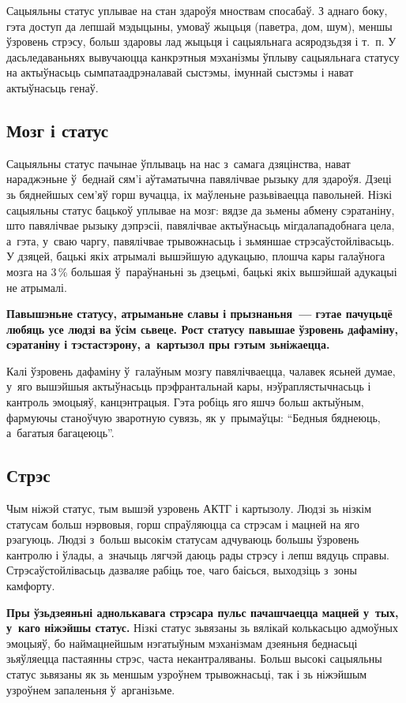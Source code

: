 Сацыяльны статус уплывае на стан здароўя мноствам спосабаў. З аднаго боку, гэта доступ да лепшай мэдыцыны, умоваў жыцьця (паветра, дом, шум), меншы ўзровень стрэсу, больш здаровы лад жыцьця і сацыяльнага асяродзьдзя і т.~п. У дасьледаваньнях вывучаюцца канкрэтныя мэханізмы ўплыву сацыяльнага статусу на актыўнасьць сымпатаадрэналавай сыстэмы, імуннай сыстэмы і нават актыўнасьць генаў.

\subsection*{Мозг і статус}

Сацыяльны статус пачынае ўплываць на нас з~самага дзяцінства, нават нараджэньне ў~беднай сям'і аўтаматычна павялічвае рызыку для здароўя. Дзеці зь бяднейшых сем'яў горш вучацца, іх маўленьне разьвіваецца павольней. Нізкі сацыяльны статус бацькоў уплывае на мозг: вядзе да зьмены абмену сэратаніну, што павялічвае рызыку дэпрэсіі, павялічвае актыўнасьць мігдалападобнага цела, а~гэта, у~сваю чаргу, павялічвае трывожнасьць і зьмяншае стрэсаўстойлівасьць. У дзяцей, бацькі якіх атрымалі вышэйшую адукацыю, плошча кары галаўнога мозга на 3\,\% большая ў~параўнаньні зь дзецьмі, бацькі якіх вышэйшай адукацыі не атрымалі.

\textbf{Павышэньне статусу, атрыманьне славы і прызнаньня~--- гэтае пачуцьцё любяць усе людзі ва ўсім сьвеце. Рост статусу павышае ўзровень дафаміну, сэратаніну і тэстастэрону, а~картызол пры гэтым зьніжаецца.}

Калі ўзровень дафаміну ў~галаўным мозгу павялічваецца, чалавек ясьней думае, у~яго вышэйшыя актыўнасьць прэфрантальнай кары, нэўраплястычнасьць і кантроль эмоцыяў, канцэнтрацыя. Гэта робіць яго яшчэ больш актыўным, фармуючы станоўчую зваротную сувязь, як у~прымаўцы: ``Бедныя бяднеюць, а~багатыя багацеюць''.

\subsection*{Стрэс}

Чым ніжэй статус, тым вышэй узровень АКТГ і картызолу. Людзі зь нізкім статусам больш нэрвовыя, горш спраўляюцца са стрэсам і мацней на яго рэагуюць. Людзі з~больш высокім статусам адчуваюць большы ўзровень кантролю і ўлады, а~значыць лягчэй даюць рады стрэсу і лепш вядуць справы. Стрэсаўстойлівасьць дазваляе рабіць тое, чаго баісься, выходзіць з~зоны камфорту.

\textbf{Пры ўзьдзеяньні аднолькавага стрэсара пульс пачашчаецца мацней у~тых, у~каго ніжэйшы статус.} Нізкі статус зьвязаны зь вялікай колькасьцю адмоўных эмоцыяў, бо наймацнейшым нэгатыўным мэханізмам дзеяньня беднасьці зьяўляецца пастаянны стрэс, часта некантраляваны. Больш высокі сацыяльны статус зьвязаны як зь меншым узроўнем трывожнасьці, так і зь ніжэйшым узроўнем запаленьня ў~арганізьме.

